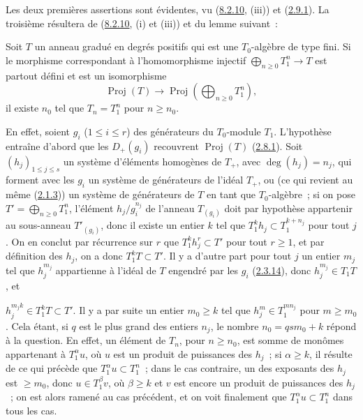 Les deux premières assertions sont évidentes, vu
(\hyperref[II.8.2.10-fr]{8.2.10}, (iii)) et
(\hyperref[II.2.9.1-fr]{2.9.1}). La troisième résultera de
(\hyperref[II.8.2.10-fr]{8.2.10}, (i) et (iii)) et du lemme suivant~:

\begin{lemma}[8.2.14.1]
\label{II.8.2.14.1-fr}
Soit $T$ un anneau gradué en degrés positifs qui est une $T_0$-algèbre de type
fini. Si le morphisme correspondant à l'homomorphisme injectif
$\bigoplus_{n\geq0}T_1^n\to T$ est partout défini et est un isomorphisme
\[
  \operatorname{Proj}(T)\to
  \operatorname{Proj}\left(\bigoplus_{n\geq0}T_1^n\right),
\]
il existe $n_0$ tel que $T_n=T_1^n$ pour $n\geq n_0$.
\end{lemma}

En effet, soient $g_i$ ($1\leq i\leq r$) des générateurs du $T_0$-module
$T_1$. L'hypothèse entraîne d'abord que les $D_+(g_i)$ recouvrent
$\operatorname{Proj}(T)$ (\hyperref[II.2.8.1-fr]{2.8.1}). Soit
$(h_j)_{1\leq j\leq s}$ un système d'éléments homogènes de $T_+$, avec
$\deg(h_j)=n_j$, qui forment avec les $g_i$ un système de générateurs de
l'idéal $T_+$, ou (ce qui revient au même
(\hyperref[II.2.1.3-fr]{2.1.3})) un système de générateurs de $T$ en tant que
$T_0$-algèbre~; si on pose $T'=\bigoplus_{n\geq0}T_1^n$, l'élément
$h_j/g_i^{n_j}$ de l'anneau $T_{(g_i)}$ doit par hypothèse appartenir au
sous-anneau $T'_{(g_i)}$, donc il existe un entier $k$ tel que
$T_1^k h_j\subset T_1^{k+n_j}$ pour tout $j$. On en conclut par récurrence
sur $r$ que $T_1^k h_j^r\subset T'$ pour tout $r\geq1$, et par définition des
$h_j$, on a donc $T_1^kT\subset T'$. Il y a d'autre part pour tout $j$ un
entier $m_j$ tel que $h_j^{m_j}$ appartienne à l'idéal de $T$ engendré par
les $g_i$ (\hyperref[II.2.3.14-fr]{2.3.14}), donc $h_j^{m_j}\in T_1T$, et

$h_j^{m_jk}\in T_1^kT\subset T'$. Il y a par suite un entier $m_0\geq k$ tel
que $h_j^m\in T_1^{mn_j}$ pour $m\geq m_0$. Cela étant, si $q$ est le plus
grand des entiers $n_j$, le nombre $n_0=qsm_0+k$ répond à la question. En
effet, un élément de $T_n$, pour $n\geq n_0$, est somme de monômes appartenant
à $T_1^\alpha u$, où $u$ est un produit de puissances des $h_j$~; si
$\alpha\geq k$, il résulte de ce qui précède que $T_1^\alpha u\subset T_1^n$~;
dans le cas contraire, un des exposants des $h_j$ est $\geq m_0$, donc
$u\in T_1^\beta v$, où $\beta\geq k$ et $v$ est encore un produit de
puissances des $h_j$~; on est alors ramené au cas précédent, et on voit
finalement que $T_1^\alpha u\subset T_1^n$ dans tous les cas.

